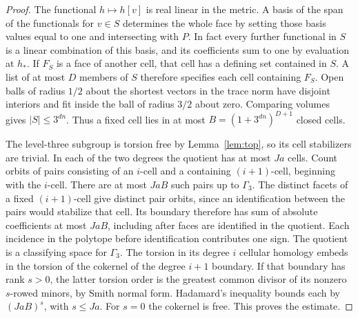 \documentclass[a4paper,11pt]{article}
\theoremstyle{definition}
\theoremstyle{remark}
\numberwithin{equation}{section}
\begin{document}
\begin{proof}
The functional \(h\mapsto h[v]\) is real linear in the metric.
A basis of the span of the functionals for \(v\in S\) determines
the whole face by setting those basis values equal to one and
intersecting with \(P\). In fact every further functional in \(S\)
is a linear combination of this basis, and its coefficients sum
to one by evaluation at \(h_*\). If \(F_S\) is a face of another
cell, that cell has a defining set contained in \(S\). A list of
at most \(D\) members of \(S\) therefore specifies each cell
containing \(F_S\). Open balls of radius \(1/2\) about the shortest
vectors in the trace norm have disjoint interiors and fit inside
the ball of radius \(3/2\) about zero. Comparing volumes gives
\(|S|\le3^{dn}\). Thus a fixed cell lies in at most
\(B=(1+3^{dn})^{D+1}\) closed cells.

The level-three subgroup is torsion free by Lemma~\ref{lem:top},
so its cell stabilizers are trivial. In each of the two degrees the
quotient has at most \(Ja\) cells. Count orbits of pairs consisting
of an \(i\)-cell and a containing \((i+1)\)-cell, beginning with
the \(i\)-cell. There are at most \(JaB\) such pairs up to
\(\Gamma_3\). The distinct facets of a fixed \((i+1)\)-cell give
distinct pair orbits, since an identification between the pairs
would stabilize that cell. Its boundary therefore has sum of
absolute coefficients at most \(JaB\), including after faces are
identified in the quotient. Each incidence in the polytope before
identification contributes one sign. The quotient is a
classifying space for \(\Gamma_3\). The torsion in its degree
\(i\) cellular homology embeds in the torsion of the cokernel of
the degree \(i+1\) boundary. If that boundary has rank \(s>0\),
the latter torsion order is the greatest common divisor of its
nonzero \(s\)-rowed minors, by Smith normal form. Hadamard's
inequality bounds each by \((JaB)^s\), with \(s\le Ja\).
For \(s=0\) the cokernel is free. This proves the estimate.
\end{proof}
\end{document}

